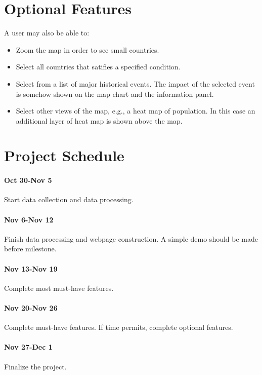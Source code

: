 \documentclass[12pt, fullpage,letterpaper]{article}
\begin{document}
\section{Optional Features}
A user may also be able to:
\begin{itemize}
    \item Zoom the map in order to see small countries.
    \item Select all countries that satifies a specified condition.
    \item Select from a list of major historical events. The impact of the selected event is somehow shown on the map chart and the information panel.
    \item Select other views of the map, e.g., a heat map of population. In this case an additional layer of heat map is shown above the map.
\end{itemize}

\section{Project Schedule}
\paragraph{Oct 30-Nov 5} Start data collection and data processing.
\paragraph{Nov 6-Nov 12} Finish data processing and webpage construction. A simple demo should be made before milestone.
\paragraph{Nov 13-Nov 19} Complete most must-have features.
\paragraph{Nov 20-Nov 26} Complete must-have features. If time permits, complete optional features.
\paragraph{Nov 27-Dec 1} Finalize the project.
\end{document}
